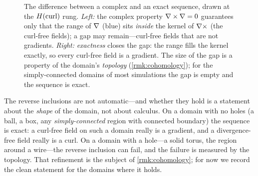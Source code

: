 \begin{figure}[t]
\centering
{}
\caption[Complex versus exact]{The difference between a complex and an exact
sequence, drawn at the $H(\mathrm{curl})$ rung. \emph{Left:} the complex property
$\nabla\times\nabla=0$ guarantees only that the range of $\nabla$ (blue) sits \emph{inside}
the kernel of $\nabla\times$ (the curl-free fields); a gap may remain---curl-free fields
that are not gradients. \emph{Right:} \emph{exactness} closes the gap: the range
fills the kernel exactly, so every curl-free field is a gradient. The size of the
gap is a property of the domain's \emph{topology} (\cref{rmk:cohomology}); for the
simply-connected domains of most simulations the gap is empty and the sequence is
exact.}
\label{fig:exact}
\end{figure}

The reverse inclusions are not automatic---and whether they hold is a statement
about the \emph{shape} of the domain, not about calculus. On a domain with no holes
(a ball, a box, any \emph{simply-connected} region with connected boundary) the
sequence is exact: a curl-free field on such a domain really is a gradient, and a
divergence-free field really is a curl. On a domain with a hole---a solid torus, the
region around a wire---the reverse inclusion can fail, and the failure is measured by
the topology. That refinement is the subject of \cref{rmk:cohomology}; for now we
record the clean statement for the domains where it holds.

